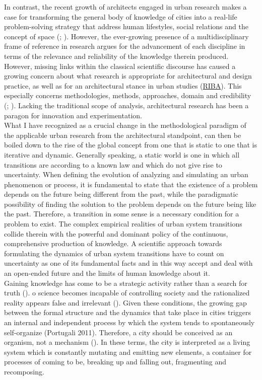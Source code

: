 \documentclass[11pt]{report}
\begin{document}
In contrast, the recent growth of architects engaged in urban research makes a case for transforming the general body of knowledge of cities into a real-life problem-solving strategy that address human lifestyles, social relations and the concept of space (\href{ref}{\cite{castells 2000}}; \href{ref}{\cite{dijk 2002}}).
However, the ever-growing presence of a multidisciplinary frame of reference in research  argues for the advancement of each discipline in terms of the relevance and reliability of the knowledge therein produced.  However, missing links within the classical scientific discourse has caused a growing concern about what research is appropriate for architectural and design practice, as well as for an architectural stance in urban studies (\href{RIBA}{RIBA}). This especially concerns methodologies, methods, approaches, domain and credibility ({\citealt{savic_what_2014}; \citealt{savic_introduction:_2016}). Lacking the traditional scope of analysis, architectural research has been a paragon for innovation and experimentation.
\\

What I have recognized as a crucial change in the methodological paradigm of the applicable urban research from the architectural standpoint, can then be boiled down to the rise of the global concept from one that is static to one that is iterative and dynamic.
Generally speaking, a static world is one in which all transitions are according to a known law and which do not give rise to uncertainty. When defining the evolution of analyzing and simulating an urban phenomenon or process, it is fundamental to state that the existence of a problem depends on the future being different from the past, while the paradigmatic possibility of finding the solution to the problem depends on the future being like the past. Therefore, a transition in some sense is a necessary condition for a problem to exist. The complex empirical realities of urban system transitions collide therein with the powerful and dominant policy of the continuous, comprehensive production of knowledge. A scientific approach towards formulating the dynamics of urban system transitions have to count on uncertainty as one of its fundamental facts and in this way accept and deal with an open-ended future and the limits of human knowledge about it.
\\

Gaining knowledge has come to be a strategic activity rather than a search for truth (\href{ref}{\citealt{kirby_cities_2013}}). 
o science becomes incapable of controlling society and the rationalized reality appears false and irrelevant (\href{ref}{\citealt{alfasi_planning_2004}}). Given these conditions, the growing gap between the formal structure and the dynamics that take place in cities triggers an internal and independent process by which the system tends to spontaneously self-organize (Portugali 2011). Therefore, a city should be conceived as an organism, not a mechanism (\href{ref}{\citealt{landry_creative_2012}}). In these terms, the city is interpreted as a living system which is constantly mutating and emitting new elements, a container for processes of coming to be, breaking up and falling out, fragmenting and recomposing.
\\

}
\end{document}
